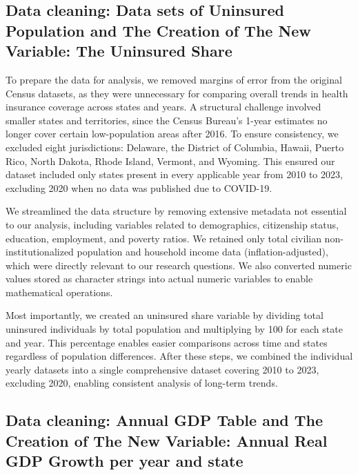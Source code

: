 \documentclass[
]{article}
\begin{document}
\subsection{Data cleaning: Data sets of Uninsured Population and The
Creation of The New Variable: The Uninsured
Share}\label{data-cleaning-data-sets-of-uninsured-population-and-the-creation-of-the-new-variable-the-uninsured-share}

To prepare the data for analysis, we removed margins of error from the
original Census datasets, as they were unnecessary for comparing overall
trends in health insurance coverage across states and years. A
structural challenge involved smaller states and territories, since the
Census Bureau's 1-year estimates no longer cover certain low-population
areas after 2016. To ensure consistency, we excluded eight
jurisdictions: Delaware, the District of Columbia, Hawaii, Puerto Rico,
North Dakota, Rhode Island, Vermont, and Wyoming. This ensured our
dataset included only states present in every applicable year from 2010
to 2023, excluding 2020 when no data was published due to COVID-19.

We streamlined the data structure by removing extensive metadata not
essential to our analysis, including variables related to demographics,
citizenship status, education, employment, and poverty ratios. We
retained only total civilian non-institutionalized population and
household income data (inflation-adjusted), which were directly relevant
to our research questions. We also converted numeric values stored as
character strings into actual numeric variables to enable mathematical
operations.

Most importantly, we created an uninsured share variable by dividing
total uninsured individuals by total population and multiplying by 100
for each state and year. This percentage enables easier comparisons
across time and states regardless of population differences. After these
steps, we combined the individual yearly datasets into a single
comprehensive dataset covering 2010 to 2023, excluding 2020, enabling
consistent analysis of long-term trends.

\subsection{Data cleaning: Annual GDP Table and The Creation of The New
Variable: Annual Real GDP Growth per year and
state}\label{data-cleaning-annual-gdp-table-and-the-creation-of-the-new-variable-annual-real-gdp-growth-per-year-and-state}
\end{document}
